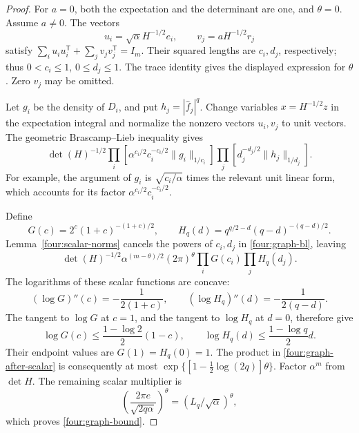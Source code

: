 \begin{proof}
For \(a=0\), both the expectation and the determinant are one,
and \(\theta=0\).  Assume \(a\ne0\).
The vectors
\[
 u_i=\sqrt\alpha H^{-1/2}e_i,\qquad
 v_j=aH^{-1/2}r_j
\]
satisfy
\(\sum_i u_iu_i^{\mathsf T}+\sum_jv_jv_j^{\mathsf T}=I_m\).
Their squared lengths are \(c_i,d_j\), respectively; thus
\(0<c_i\leq1\), \(0\leq d_j\leq1\).
The trace identity gives the displayed expression for \(\theta\).
Zero \(v_j\) may be omitted.

Let \(g_i\) be the density of \(D_i\), and put
\(h_j=|\widehat f_j|^q\).  Change variables \(x=H^{-1/2}z\)
in the expectation integral and normalize the nonzero vectors
\(u_i,v_j\) to unit vectors.  The geometric Brascamp--Lieb
inequality gives
\begin{equation}\label{four:graph-bl}
 \det(H)^{-1/2}
 \prod_i\left[\alpha^{c_i/2}c_i^{-c_i/2}\|g_i\|_{1/c_i}\right]
 \prod_j\left[d_j^{-d_j/2}\|h_j\|_{1/d_j}\right].
\end{equation}
For example, the argument of \(g_i\) is
\(\sqrt{c_i/\alpha}\) times the relevant unit linear form, which
accounts for its factor \(\alpha^{c_i/2}c_i^{-c_i/2}\).

Define
\[
 G(c)=2^c(1+c)^{-(1+c)/2},\qquad
 H_q(d)=q^{q/2-d}(q-d)^{-(q-d)/2}.
\]
Lemma~\ref{four:scalar-norms} cancels the powers of \(c_i,d_j\)
in \eqref{four:graph-bl}, leaving
\begin{equation}\label{four:graph-after-scalar}
 \det(H)^{-1/2}\alpha^{(m-\theta)/2}(2\pi)^\theta
                     \prod_iG(c_i)\prod_jH_q(d_j).
\end{equation}
The logarithms of these scalar functions are concave:
\[
 (\log G)''(c)=-\frac1{2(1+c)},\qquad
 (\log H_q)''(d)=-\frac1{2(q-d)}.
\]
The tangent to \(\log G\) at \(c=1\), and the tangent to
\(\log H_q\) at \(d=0\), therefore give
\[
 \log G(c)\leq\frac{1-\log2}{2}(1-c),\qquad
 \log H_q(d)\leq\frac{1-\log q}{2}d.
\]
Their endpoint values are \(G(1)=H_q(0)=1\).
The product in \eqref{four:graph-after-scalar} is consequently
at most \(\exp\{[1-\tfrac12\log(2q)]\theta\}\).
Factor \(\alpha^m\) from \(\det H\).  The remaining scalar
multiplier is
\[
 \left(\frac{2\pi e}{\sqrt{2q\alpha}}\right)^\theta
 =(L_q/\sqrt\alpha)^\theta,
\]
which proves \eqref{four:graph-bound}.
\end{proof}

